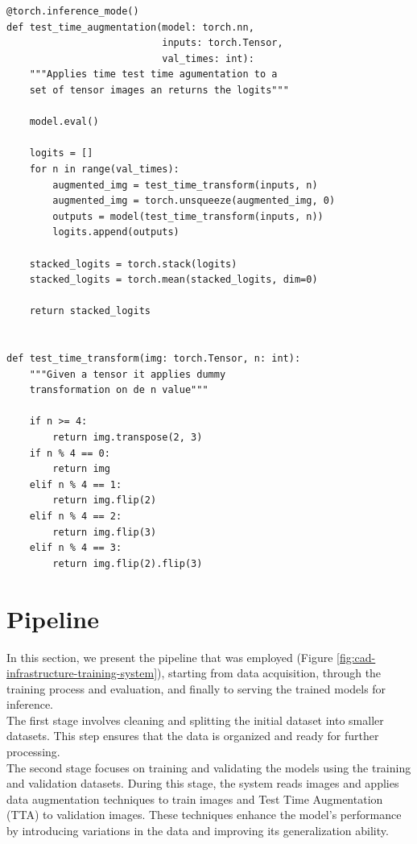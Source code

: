 \begin{Verbatim}[fontsize=\scriptsize]
@torch.inference_mode()
def test_time_augmentation(model: torch.nn,
                           inputs: torch.Tensor,
                           val_times: int):
    """Applies time test time agumentation to a
    set of tensor images an returns the logits"""

    model.eval()

    logits = []
    for n in range(val_times):
        augmented_img = test_time_transform(inputs, n)
        augmented_img = torch.unsqueeze(augmented_img, 0)
        outputs = model(test_time_transform(inputs, n))
        logits.append(outputs)

    stacked_logits = torch.stack(logits)
    stacked_logits = torch.mean(stacked_logits, dim=0)

    return stacked_logits


def test_time_transform(img: torch.Tensor, n: int):
    """Given a tensor it applies dummy
    transformation on de n value"""

    if n >= 4:
        return img.transpose(2, 3)
    if n % 4 == 0:
        return img
    elif n % 4 == 1:
        return img.flip(2)
    elif n % 4 == 2:
        return img.flip(3)
    elif n % 4 == 3:
        return img.flip(2).flip(3)
\end{Verbatim}

\section{Pipeline}

In this section, we present the pipeline that was employed (Figure
\ref{fig:cad-infrastructure-training-system}), starting from data acquisition,
through the training process and evaluation, and finally to serving the trained
models for inference. \\

The first stage involves cleaning and splitting the initial dataset into
smaller datasets. This step ensures that the data is organized and ready for
further processing. \\

The second stage focuses on training and validating the models using the
training and validation datasets. During this stage, the system reads images
and applies data augmentation techniques to train images and Test Time
Augmentation (TTA) to validation images. These techniques enhance the model's
performance by introducing variations in the data and improving its
generalization ability. \\


